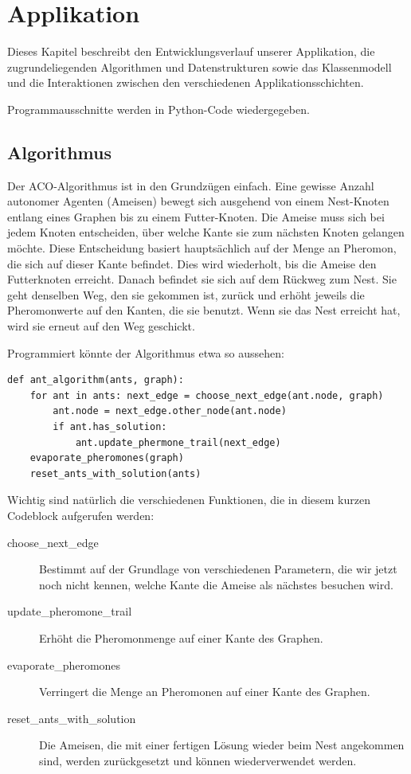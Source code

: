 

\chapter{Applikation}

Dieses Kapitel beschreibt den Entwicklungsverlauf unserer Applikation, die
zugrundeliegenden Algorithmen und Datenstrukturen sowie das Klassenmodell und
die Interaktionen zwischen den verschiedenen Applikationsschichten.

Programmausschnitte werden  in Python-Code wiedergegeben.

\section{Algorithmus}\label{sec:algorithm}

Der ACO-Algorithmus ist in den Grundzügen einfach. Eine gewisse Anzahl autonomer
Agenten (Ameisen) bewegt sich ausgehend von einem Nest-Knoten entlang eines
Graphen bis zu einem Futter-Knoten. Die Ameise muss sich bei jedem Knoten
entscheiden, über welche Kante sie zum nächsten Knoten gelangen möchte. Diese
Entscheidung basiert hauptsächlich auf der Menge an Pheromon, die sich auf
dieser Kante befindet. Dies wird wiederholt, bis die Ameise den Futterknoten
erreicht. Danach befindet sie sich auf dem Rückweg zum Nest. Sie geht denselben
Weg, den sie gekommen ist, zurück und erhöht jeweils die Pheromonwerte auf den
Kanten, die sie benutzt. Wenn sie das Nest erreicht hat, wird sie erneut auf den
Weg geschickt.

\noindent Programmiert könnte der Algorithmus etwa so aussehen:

\lstset{language=Python} 
\begin{lstlisting} 
def ant_algorithm(ants, graph): 
	for ant in ants: next_edge = choose_next_edge(ant.node, graph) 
		ant.node = next_edge.other_node(ant.node) 
		if ant.has_solution:
			ant.update_phermone_trail(next_edge) 
	evaporate_pheromones(graph)
	reset_ants_with_solution(ants) 
\end{lstlisting}

\noindent Wichtig sind natürlich die verschiedenen Funktionen, die in diesem
kurzen Codeblock aufgerufen werden:

\begin{description} \item[choose\_next\_edge] Bestimmt auf der Grundlage von
verschiedenen Parametern, die wir jetzt noch nicht kennen, welche Kante die
Ameise als nächstes besuchen wird. \item[update\_pheromone\_trail] Erhöht die
Pheromonmenge auf einer Kante des Graphen. \item[evaporate\_pheromones]
Verringert die Menge an Pheromonen auf einer Kante des Graphen.
\item[reset\_ants\_with\_solution] Die Ameisen, die mit einer fertigen Lösung
wieder beim Nest angekommen sind, werden zurückgesetzt und können
wiederverwendet werden. \end{description}

